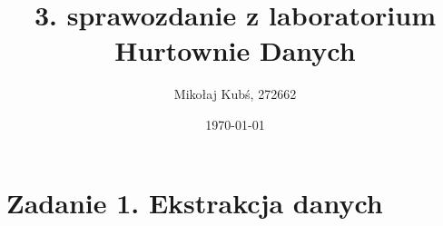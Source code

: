 \documentclass[a4paper,12pt]{article}
\title{3. sprawozdanie z laboratorium Hurtownie Danych}
\author{Mikołaj Kubś, 272662}
\date{\today}
\begin{document}
\maketitle

\section{Zadanie 1. Ekstrakcja danych}

\printbibliography
\end{document}
